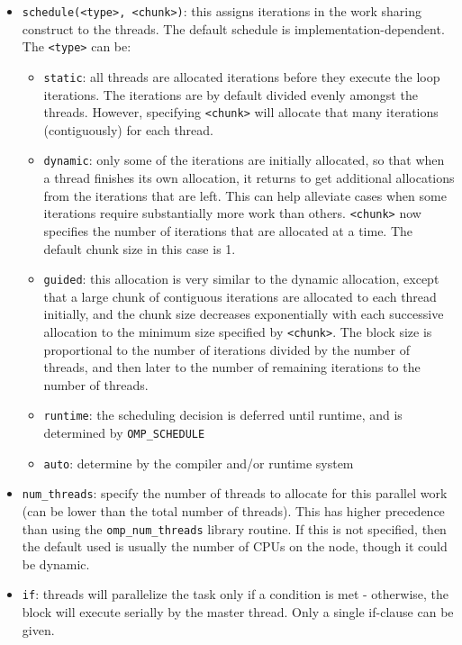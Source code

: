 \documentclass[10pt]{article}
\newcounter{subsubsubsection}[subsubsection]
\begin{document}
\begin{flushleft}

\begin{itemize}
\item {\tt schedule(<type>, <chunk>)}: this assigns iterations in the work sharing construct to the threads. The default schedule is implementation-dependent. The {\tt <type>} can be:
	\begin{itemize}
		\item {\tt static}: all threads are allocated iterations before they execute the loop iterations. The iterations are by default divided evenly amongst the threads. However, specifying {\tt <chunk>} will allocate that many iterations (contiguously) for each thread.
		\item {\tt dynamic}: only some of the iterations are initially allocated, so that when a thread finishes its own allocation, it returns to get additional allocations from the iterations that are left. This can help alleviate cases when some iterations require substantially more work than others. {\tt <chunk>} now specifies the number of iterations that are allocated at a time. The default chunk size in this case is 1.
		\item {\tt guided}: this allocation is very similar to the dynamic allocation, except that a large chunk of contiguous iterations are allocated to each thread initially, and the chunk size decreases exponentially with each successive allocation to the minimum size specified by {\tt <chunk>}. The block size is proportional to the number of iterations divided by the number of threads, and then later to the number of remaining iterations to the number of threads. 
		\item {\tt runtime}: the scheduling decision is deferred until runtime, and is determined by {\tt OMP\_SCHEDULE}
		\item {\tt auto}: determine by the compiler and/or runtime system
	\end{itemize}
\item {\tt num\_threads}: specify the number of threads to allocate for this parallel work (can be lower than the total number of threads). This has higher precedence than using the {\tt omp\_num\_threads} library routine. If this is not specified, then the default used is usually the number of CPUs on the node, though it could be dynamic. 
\end{itemize}


\begin{itemize}
\item {\tt if}: threads will parallelize the task only if a condition is met - otherwise, the block will execute serially by the master thread. Only a single if-clause can be given. 
\end{itemize}


\end{flushleft}
\end{document}
